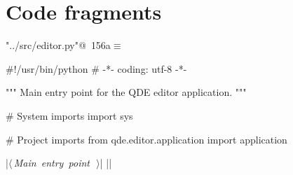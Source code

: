 \documentclass[%
    a4paper,    %
    justified,  %
    nobib,      %
    openany     %
]{tufte-book}
\begin{document}

\section{Code fragments}
\label{sec:code-fragments}

\begin{flushleft} \small
\begin{minipage}{\linewidth}\label{scrap166}\raggedright\small
{} \verb@"../src/editor.py"@\nobreak\ {\footnotesize {156a}}$\equiv$
\vspace{-1ex}
\begin{pythoncode}
#!/usr/bin/python
# -*- coding: utf-8 -*-

""" Main entry point for the QDE editor application. """

# System imports
import sys

# Project imports
from qde.editor.application import application

|\hbox{$\langle\,${\itshape Main entry point}\nobreak\ {\footnotesize {}}$\,\rangle$}|
|\NWsep|
\end{pythoncode}
\vspace{1.5ex}
\footnotesize
\begin{list}{}{\setlength{\itemsep}{-\parsep}\setlength{\itemindent}{-\leftmargin}}

\item{}
\end{list}
\end{minipage}\vspace{4ex}
\end{flushleft}
\end{document}
